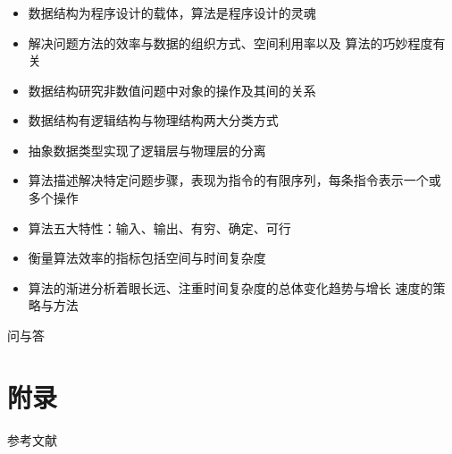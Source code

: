 \begin{frame}
    \frametitle{\insertsectionhead}
    \begin{itemize}
        \item 数据结构为程序设计的\alert{载体}，算法是程序设计的\alert{灵魂}
        \item 解决问题方法的效率与\alert{数据的组织方式}、\alert{空间利用率}以及
        \alert{算法的巧妙程度}有关
        \item 数据结构研究\alert{非数值}问题中对象的操作及其间的关系
        \item 数据结构有\alert{逻辑结构}与\alert{物理结构}两大分类方式
        \item 抽象数据类型实现了逻辑层与物理层的分离
        \item 算法描述解决特定问题步骤，表现为指令的有限序列，每条指令表示一个或
        多个操作
        \item 算法五大特性：输入、输出、有穷、确定、可行
        \item 衡量算法效率的指标包括\alert{空间}与\alert{时间}复杂度
        \item 算法的渐进分析着眼长远、注重时间复杂度的\alert{总体变化趋势}与增长
        速度的策略与方法
    \end{itemize}
\end{frame}

\begin{standout}[]
    问与答
\end{standout}

\appendix

\section{附录}

\begin{frame}[allowframebreaks]{参考文献}
    
    
\end{frame}